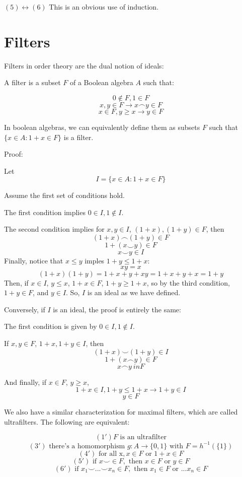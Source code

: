 \documentclass{article}
\begin{document}
      $(5) \leftrightarrow (6)$ This is an obvious use of induction.

    \section{Filters}

      Filters in order theory are the dual notion of ideals:

      A filter is a subset $F$ of a Boolean algebra $A$ such that:

      \[0 \notin F, 1 \in F\]
      \[x, y \in F \rightarrow x \frown y \in F\]
      \[x \in F, y \geq x \rightarrow y \in F\]

      In boolean
      algebras, we can equivalently define them as subsets $F$ such that $\{x
      \in A: 1+x \in F\}$ is a filter.

      Proof:

      Let
      \[I = \{x \in A: 1+x \in F\}\]


      Assume the first set of conditions hold.

      The first condition implies $0 \in I, 1 \notin I$.

      The second condition implies for $x, y \in I$, $(1+x), (1+y) \in F$, then
      \[(1+x) \frown (1+y) \in F\]
      \[1 + (x \smile y) \in F\]
      \[x \smile y \in I\]
      Finally, notice that $x \leq y$ imples $1+y \leq 1+x$:
      \[xy = x\]
      \[(1+x)(1+y) = 1 + x + y + xy = 1 + x + y + x = 1 + y\]
      Then, if $x \in I$, $y \leq x$, $1+x \in F$, $1+y \geq 1+x$, so by the
      third condition, $1+y \in F$, and $y \in I$.
      So, $I$ is an ideal as we have defined.

      Conversely, if $I$ is an ideal, the proof is entirely the same:
      
      The first condition is given by $0 \in I, 1 \notin I$.

      If $x, y \in F$, $1+x, 1+y \in I$, then
      \[(1+x) \smile (1+y) \in I\]
      \[1 + (x \frown y) \in F\]
      \[x \frown y \ in F\]

      And finally, if $x \in F$, $y \geq x$,
      \[1+x \in I, 1+y \leq 1+x \rightarrow 1+y \in I\]
      \[y \in F\]

      We also have a similar characterization for maximal filters, which are
      called ultrafilters. The following are equivalent:

      \[(1') F \text{ is an ultrafilter}\]
      \[(3') \text{ there's a homomorphism } g: A \rightarrow \{0,1\} \text{ with }
      F = h^{-1}(\{1\})\]
      \[(4') \text{ for all x}, x \in F \text{ or } 1+x \in F\]
      \[(5') \text{ if } x \smile \in F, \text{ then } x \in F \text{ or } y \in
      F\]
      \[(6') \text{ if } x_1 \smile ... \smile x_n \in F, \text{ then } x_1 \in
      F \text{ or } ... x_n \in F\]
\end{document}
